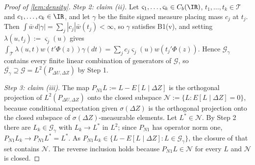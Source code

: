 \begin{proof}[Proof of \cref{lem:density}]
\emph{Step 2: claim (ii).}
Let $\varsigma_1,\dots,\varsigma_k\in C_b(\IR)$, $t_1,\dots,t_k\in\mathcal T$ and
$c_1,\dots,c_k\in\IR$, and let $\gamma$ be the finite signed measure placing mass $c_j$ at $t_j$. Then
$\int\bar w\,d|\gamma|=\sum_j|c_j|\bar w(t_j)<\infty$, so $\gamma$ satisfies B1(v), and setting
$\lambda(u,t_j):=\varsigma_j(u)$ gives
$\int_{\mathcal T}\lambda(u,t)w(t'\Phi(z))\gamma(dt)=\sum_j c_j\varsigma_j(u)w(t_j'\Phi(z))$. Hence
$\mathcal G_\gamma$ contains every finite linear combination of generators of $\mathcal G$, so
$\overline{\mathcal G_\gamma}\supseteq\mathcal G=L^{2}(P_{\Delta U,\Delta Z})$ by Step 1.

\emph{Step 3: claim (iii).}
The map $P_{N1}L:=L-E[L\mid\Delta Z]$ is the orthogonal projection of $L^{2}(P_{\Delta U,\Delta Z})$ onto
the closed subspace $\mathcal N:=\{L:E[L\mid\Delta Z]=0\}$, because conditional expectation given
$\sigma(\Delta Z)$ is the orthogonal projection onto the closed subspace of
$\sigma(\Delta Z)$-measurable elements. Let $L^{\ast}\in\mathcal N$. By Step 2 there are
$L_k\in\mathcal G_\gamma$ with $L_k\to L^{\ast}$ in $L^{2}$; since $P_{N1}$ has operator norm one,
$P_{N1}L_k\to P_{N1}L^{\ast}=L^{\ast}$. As $P_{N1}L_k\in\{L-E[L\mid\Delta Z]:L\in\mathcal G_\gamma\}$,
the closure of that set contains $\mathcal N$. The reverse inclusion holds because
$P_{N1}L\in\mathcal N$ for every $L$ and $\mathcal N$ is closed.
\end{proof}


